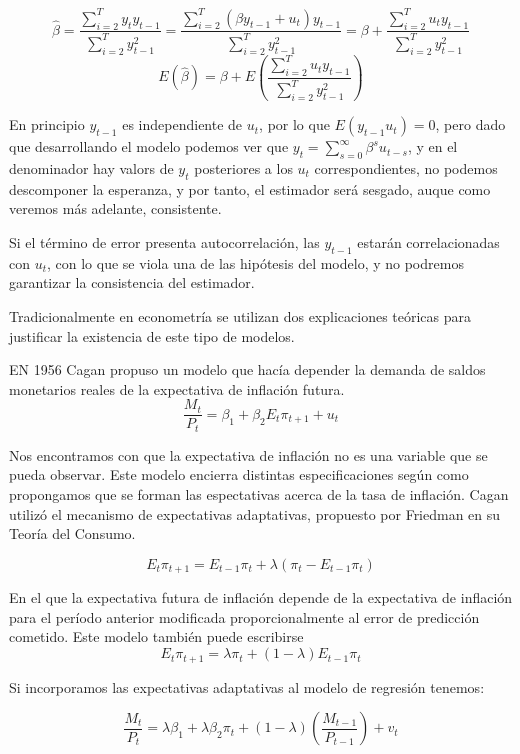 \[\hat{\beta}=\dfrac{\sum_{i=2}^Ty_ty_{t-1}}{\sum_{i=2}^Ty_{t-1}^2}=\dfrac{\sum_{i=2}^T(\beta y_{t-1}+u_t)y_{t-1}}{\sum_{i=2}^Ty_{t-1}^2}=\beta+\dfrac{\sum_{i=2}^Tu_ty_{t-1}}{\sum_{i=2}^Ty_{t-1}^2}\]
\[E(\hat{\beta})=\beta+E\left(\dfrac{\sum_{i=2}^Tu_ty_{t-1}}{\sum_{i=2}^Ty_{t-1}^2}\right)\]

En principio $y_{t-1}$ es independiente de $u_t$, por lo que $E(y_{t-1}u_t)=0$, pero dado que desarrollando el modelo podemos ver que $y_t=\sum_{s=0}^{\infty}\beta^su_{t-s}$, y en el denominador hay valors de $y_t$ posteriores a los $u_t$ correspondientes, no podemos descomponer la esperanza, y por tanto, el estimador ser\'a sesgado, auque como veremos m\'as adelante, consistente.

Si el t\'ermino de error presenta autocorrelaci\'on, las $y_{t-1}$ estar\'an correlacionadas con $u_t$, con lo que se viola una de las hip\'otesis del modelo, y no podremos garantizar la consistencia del estimador.


Tradicionalmente en econometr\'ia se utilizan dos explicaciones te\'oricas para justificar la existencia de este tipo de modelos.


EN 1956 Cagan propuso un modelo que hac\'ia depender la demanda de saldos monetarios reales de la expectativa de inflaci\'on futura.
\[\dfrac{M_t}{P_t}=\beta_1+\beta_2E_t\pi_{t+1}+u_t\]

Nos encontramos con que la expectativa de inflaci\'on no es una variable que se pueda observar. Este modelo encierra distintas especificaciones seg\'un como propongamos que se forman las espectativas acerca de la tasa de inflaci\'on. Cagan utiliz\'o el mecanismo de expectativas adaptativas, propuesto por Friedman en su Teor\'ia del Consumo.

\[E_t\pi_{t+1}=E_{t-1}\pi_{t}+\lambda(\pi_t-E_{t-1}\pi_{t})\]

En el que la expectativa futura de inflaci\'on depende de la expectativa de inflaci\'on para el per\'iodo anterior modificada proporcionalmente al error de predicci\'on cometido. Este modelo tambi\'en puede escribirse
\[E_t\pi_{t+1}=\lambda\pi_t+(1-\lambda)E_{t-1}\pi_{t}\]

Si incorporamos las expectativas adaptativas al modelo de regresi\'on tenemos:

\[\dfrac{M_t}{P_t}=\lambda\beta_1+\lambda\beta_2\pi_t+(1-\lambda)\left(\dfrac{M_{t-1}}{P_{t-1}}\right)+v_t\]

